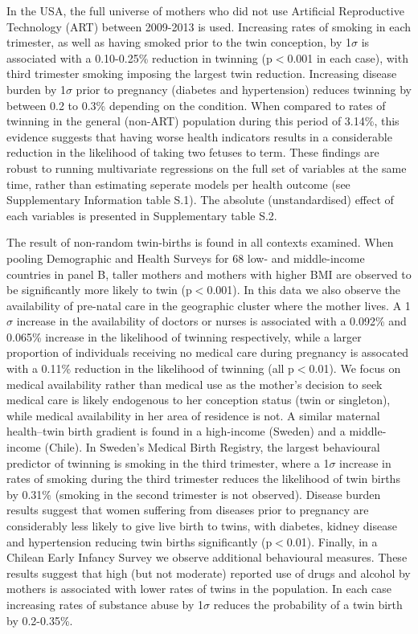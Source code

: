 \documentclass{nature}
\begin{document}
\begin{linenumbers}
In the USA, the full universe of mothers who did not use Artificial Reproductive Technology (ART) between 2009-2013 is used.  Increasing rates of smoking in each trimester, as well as having smoked prior to the twin conception, by 1$\sigma$ is associated with a 0.10-0.25\% reduction in twinning (p$<$0.001 in each case), with third trimester smoking imposing the largest twin reduction.  Increasing disease burden by 1$\sigma$ prior to pregnancy (diabetes and hypertension) reduces twinning by between 0.2 to 0.3\% depending on the condition. When compared to rates of twinning in the general (non-ART) population during this period of 3.14\%, this evidence suggests that having worse health indicators results in a considerable reduction in the likelihood of taking two fetuses to term.  These findings are robust to running multivariate regressions on the full set of variables at the same time, rather than estimating seperate models per health outcome (see Supplementary Information table S.1).  The absolute (unstandardised) effect of each variables is presented in Supplementary table S.2.

The result of non-random twin-births is found in all contexts examined. When pooling Demographic and Health Surveys for 68 low- and middle-income countries in panel B, taller mothers and mothers with higher BMI are observed to be significantly more likely to twin (p$<$0.001).  In this data we also observe the availability of pre-natal care in the geographic cluster where the mother lives.  A 1$\sigma$ increase in the availability of doctors or nurses is associated with a 0.092\% and 0.065\% increase in the likelihood of twinning respectively, while a larger proportion of individuals receiving no medical care during pregnancy is assocated with a 0.11\% reduction in the likelihood of twinning (all p$<$0.01).  We focus on medical availability rather than medical use as the mother's decision to seek medical care is likely endogenous to her conception status (twin or singleton), while medical availability in her area of residence is not.  A similar maternal health--twin birth gradient is found in a high-income (Sweden) and a middle-income (Chile).  In Sweden's Medical Birth Registry, the largest behavioural predictor of twinning is smoking in the third trimester, where a 1$\sigma$ increase in rates of smoking during the third trimester reduces the likelihood of twin births by 0.31\% (smoking in the second trimester is not observed).  Disease burden results suggest that women suffering from diseases prior to pregnancy are considerably less likely to give live birth to twins, with diabetes, kidney disease and hypertension reducing twin births significantly (p$<$0.01).  Finally, in a Chilean Early Infancy Survey we observe additional behavioural measures.  These results suggest that high (but not moderate) reported use of drugs and alcohol by mothers is associated with lower rates of twins in the population.  In each case increasing rates of substance abuse by 1$\sigma$ reduces the probability of a twin birth by 0.2-0.35\%.


\end{linenumbers}
\end{document}
